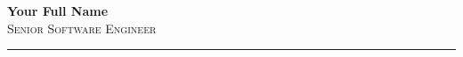 \documentclass[10pt, a4paper]{article}
\begin{document}
\begin{center}
  {\huge\textbf{Your Full Name}}\\[4pt]
  {\large\textsc{Senior Software Engineer}}\\[6pt]
  \rule{\textwidth}{0.6pt}
\end{center}

\vspace{6pt}

%
\end{document}
